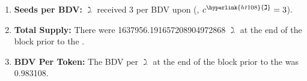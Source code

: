 \documentclass[class=article, crop=false]{standalone}
\begin{document}
\begin{enumerate}
    \item \textbf{Seeds per BDV:} \hyperlink{ht108}{$\gimel$}  received 3  per BDV upon  (, $c^{\hyperlink{ht108}{\gimel}} = 3$).
    
    \item \textbf{Total Supply:} There were 1637956.191657208904972868 \hyperlink{ht108}{$\gimel$} at the end of the block prior to the .
    
    \item \textbf{BDV Per Token:} The BDV per \hyperlink{ht108}{$\gimel$} at the end of the block prior to the  was 0.983108.
\end{enumerate}
\end{document}

